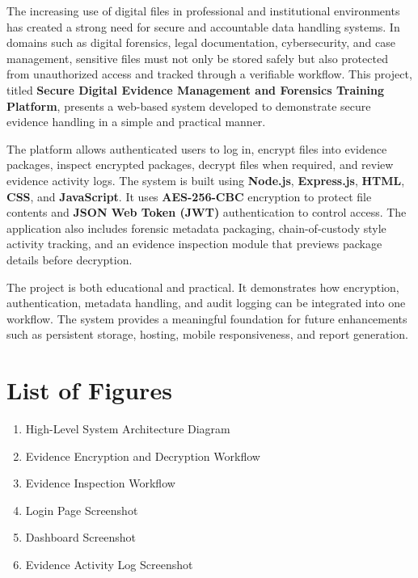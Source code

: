 \documentclass[12pt,a4paper]{report}
\begin{document}
The increasing use of digital files in professional and institutional environments has created a strong need for secure and accountable data handling systems. In domains such as digital forensics, legal documentation, cybersecurity, and case management, sensitive files must not only be stored safely but also protected from unauthorized access and tracked through a verifiable workflow. This project, titled \textbf{Secure Digital Evidence Management and Forensics Training Platform}, presents a web-based system developed to demonstrate secure evidence handling in a simple and practical manner.

The platform allows authenticated users to log in, encrypt files into evidence packages, inspect encrypted packages, decrypt files when required, and review evidence activity logs. The system is built using \textbf{Node.js}, \textbf{Express.js}, \textbf{HTML}, \textbf{CSS}, and \textbf{JavaScript}. It uses \textbf{AES-256-CBC} encryption to protect file contents and \textbf{JSON Web Token (JWT)} authentication to control access. The application also includes forensic metadata packaging, chain-of-custody style activity tracking, and an evidence inspection module that previews package details before decryption.

The project is both educational and practical. It demonstrates how encryption, authentication, metadata handling, and audit logging can be integrated into one workflow. The system provides a meaningful foundation for future enhancements such as persistent storage, hosting, mobile responsiveness, and report generation.

\clearpage

\tableofcontents
\clearpage

\chapter*{List of Figures}
\begin{enumerate}[label=\arabic*.]
\item High-Level System Architecture Diagram
\item Evidence Encryption and Decryption Workflow
\item Evidence Inspection Workflow
\item Login Page Screenshot
\item Dashboard Screenshot
\item Evidence Activity Log Screenshot
\end{enumerate}
\clearpage
\end{document}

